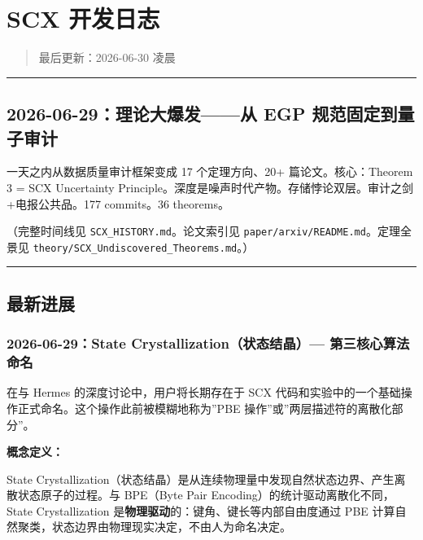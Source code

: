 \documentclass[
  12pt,
]{ctexart}
\author{SCX}
\date{2026}
\begin{document}
\section{SCX 开发日志}\label{scx-ux5f00ux53d1ux65e5ux5fd7}

\begin{quote}
最后更新：2026-06-30 凌晨
\end{quote}

\begin{center}\rule{0.5\linewidth}{0.5pt}\end{center}

\subsection{2026-06-29：理论大爆发------从 EGP
规范固定到量子审计}\label{ux7406ux8bbaux5927ux7206ux53d1ux4ece-egp-ux89c4ux8303ux56faux5b9aux5230ux91cfux5b50ux5ba1ux8ba1}

一天之内从数据质量审计框架变成 17 个定理方向、20+ 篇论文。核心：Theorem
3 = SCX Uncertainty
Principle。深度是噪声时代产物。存储悖论双层。审计之剑+电报公共品。177
commits。36 theorems。

（完整时间线见 \texttt{SCX\_HISTORY.md}。论文索引见
\texttt{paper/arxiv/README.md}。定理全景见
\texttt{theory/SCX\_Undiscovered\_Theorems.md}。）

\begin{center}\rule{0.5\linewidth}{0.5pt}\end{center}

\subsection{最新进展}\label{ux6700ux65b0ux8fdbux5c55}

\subsubsection{2026-06-29：State Crystallization（状态结晶）---
第三核心算法命名}\label{state-crystallizationux72b6ux6001ux7ed3ux6676-ux7b2cux4e09ux6838ux5fc3ux7b97ux6cd5ux547dux540d}

在与 Hermes 的深度讨论中，用户将长期存在于 SCX
代码和实验中的一个基础操作正式命名。这个操作此前被模糊地称为''PBE
操作''或''两层描述符的离散化部分''。

\textbf{概念定义：}

State
Crystallization（状态结晶）是从连续物理量中发现自然状态边界、产生离散状态原子的过程。与
BPE（Byte Pair Encoding）的统计驱动离散化不同，State Crystallization
是\textbf{物理驱动}的：键角、键长等内部自由度通过 PBE
计算自然聚类，状态边界由物理现实决定，不由人为命名决定。
\end{document}
